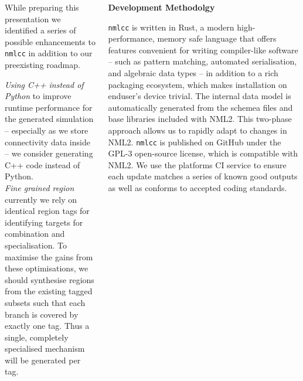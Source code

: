\documentclass{beamer}
\begin{document}
\begin{frame}[t, fragile]
\begin{columns}
\begin{column}{0.73\textwidth}
\begin{columns}[t]
\begin{column}[t]{0.49\textwidth}
          While preparing this presentation we identified a series of possible
          enhancements to \texttt{nmlcc} in addition to our preexisting roadmap.

          \emph{Using C++ instead of Python} to improve runtime performance for the
          generated simulation -- especially as we store connectivity data inside --
          we consider generating C++ code instead of Python.\\[1.5ex]
          \emph{Fine grained region} currently we rely on identical region tags for
          identifying targets for combination and specialisation. To maximise the
          gains from these optimisations, we should synthesise regions from the
          existing tagged subsets such that each branch is covered by exactly one
          tag. Thus a single, completely specialised mechanism will be generated per
          tag.
        \end{column}
        \begin{column}[t]{0.49\textwidth}
          \textbf{Development Methodolgy}

          \texttt{nmlcc} is written in Rust, a modern high-performance, memory safe
          language that offers features convenient for writing compiler-like
          software -- such as pattern matching, automated serialisation, and
          algebraic data types -- in addition to a rich packaging ecosystem, which
          makes installation on enduser's device trivial. The internal data model is
          automatically generated from the schemea files and base libraries included
          with NML2. This two-phase approach allows us to rapidly adapt to changes
          in NML2. \texttt{nmlcc} is published on GitHub under the GPL-3 open-source
          license, which is compatible with NML2. We use the platforms CI service to
          ensure each update matches a series of known good outputs as well as
          conforms to accepted coding standards.
        \end{column}
      \end{columns}
    \end{column}


\end{columns}
\end{frame}
\end{document}
